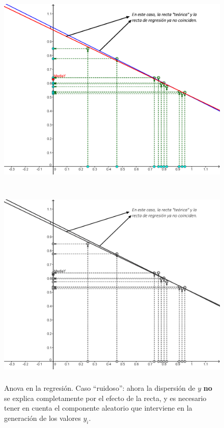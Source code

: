 \begin{ejemplo}
\begin{figure}[p]
\begin{center}
\begin{enColor}
\includegraphics[height=10cm]{../fig/Cap10-Anova02.png}
\end{enColor}
\begin{bn}
\includegraphics[height=10cm]{../fig/Cap10-Anova02-bn.png}
\end{bn}
\caption{Anova en la regresión. Caso ``ruidoso'': ahora la dispersión de $y$ {\bf no} se explica completamente por el efecto de la recta, y es necesario tener en cuenta el componente aleatorio que interviene en la generación de los valores $y_i$.}
\label{cap10:fig:Anova02}
\end{center}
\end{figure}


\end{ejemplo}
